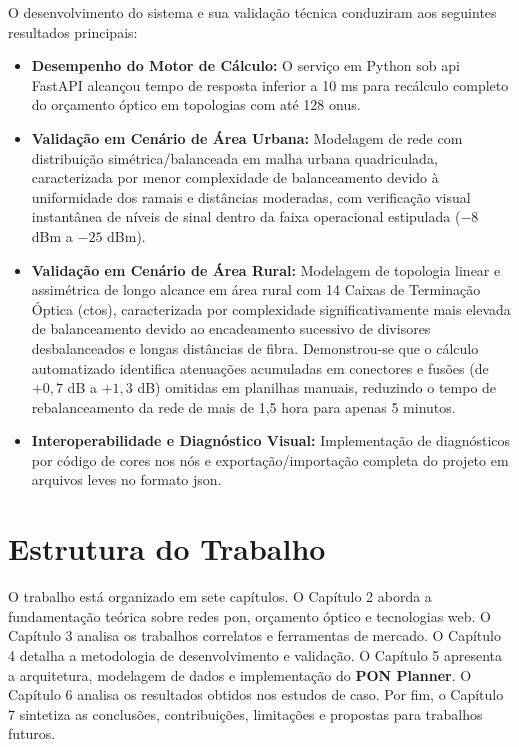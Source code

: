 O desenvolvimento do sistema e sua validação técnica conduziram aos seguintes resultados principais:
\begin{itemize}
    \item \textbf{Desempenho do Motor de Cálculo:} O serviço em Python sob \gls{api} FastAPI alcançou tempo de resposta inferior a 10 ms para recálculo completo do orçamento óptico em topologias com até 128 \glspl{onu}.
    \item \textbf{Validação em Cenário de Área Urbana:} Modelagem de rede com distribuição simétrica/balanceada em malha urbana quadriculada, caracterizada por menor complexidade de balanceamento devido à uniformidade dos ramais e distâncias moderadas, com verificação visual instantânea de níveis de sinal dentro da faixa operacional estipulada ($-8$ dBm a $-25$ dBm).
    \item \textbf{Validação em Cenário de Área Rural:} Modelagem de topologia linear e assimétrica de longo alcance em área rural com 14 Caixas de Terminação Óptica (\glspl{cto}), caracterizada por complexidade significativamente mais elevada de balanceamento devido ao encadeamento sucessivo de divisores desbalanceados e longas distâncias de fibra. Demonstrou-se que o cálculo automatizado identifica atenuações acumuladas em conectores e fusões (de $+0,7$ dB a $+1,3$ dB) omitidas em planilhas manuais, reduzindo o tempo de rebalanceamento da rede de mais de 1,5 hora para apenas 5 minutos.
    \item \textbf{Interoperabilidade e Diagnóstico Visual:} Implementação de diagnósticos por código de cores nos nós e exportação/importação completa do projeto em arquivos leves no formato \gls{json}.
\end{itemize}

\section{Estrutura do Trabalho}

O trabalho está organizado em sete capítulos. O Capítulo 2 aborda a fundamentação teórica sobre redes \gls{pon}, orçamento óptico e tecnologias web. O Capítulo 3 analisa os trabalhos correlatos e ferramentas de mercado. O Capítulo 4 detalha a metodologia de desenvolvimento e validação. O Capítulo 5 apresenta a arquitetura, modelagem de dados e implementação do \textbf{PON Planner}. O Capítulo 6 analisa os resultados obtidos nos estudos de caso. Por fim, o Capítulo 7 sintetiza as conclusões, contribuições, limitações e propostas para trabalhos futuros.
